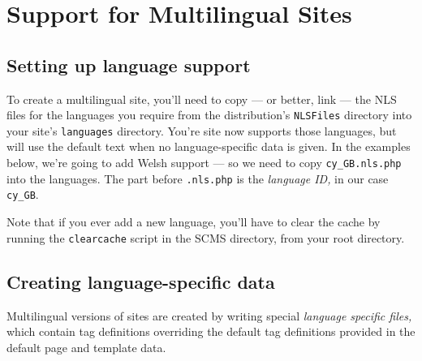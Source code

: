 %
%
%
%
%
%
% 
%
% 
% 
%

\chapter{Support for Multilingual Sites}
\label{multil}
\section{Setting up language support}
To create a multilingual site, you'll need to copy --- or better, link --- the
NLS files for the languages you require from the distribution's
\texttt{NLSFiles} directory into your site's \texttt{languages} directory.
You're site now supports those languages, but will use the default text when
no language-specific data is given. In the examples below, we're going to add
Welsh support --- so we need to copy \texttt{cy\_GB.nls.php} into the
languages. The part before \texttt{.nls.php} is the \emph{language ID,} in our
case \texttt{cy\_GB}.

Note that if you ever add a new language, you'll have to clear the cache
by running the \texttt{clearcache} script in the SCMS directory, from your
root directory.

\section{Creating language-specific data}
Multilingual versions of sites are created by writing special \emph{language
specific files,} which contain tag definitions overriding the default tag
definitions provided in the default page and template data.

